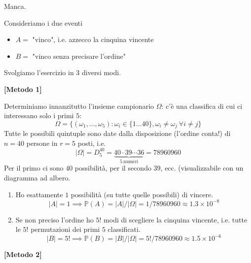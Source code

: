 Manca.
\Soluzione

Consideriamo i due eventi
\begin{itemize}
\item $A=$ "vinco", i.e. azzecco la cinquina vincente
\item $B=$ "vinco senza precisare l'ordine"
\end{itemize}

Svolgiamo l'esercizio in $3$ diversi modi.

\textbf{[Metodo 1]}

Determiniamo innanzitutto l'insieme campionario $\Omega $: c'è una classifica di cui ci interessano solo i primi $5$:
\begin{equation*}
\Omega =\{( \omega _{1} ,\dots ,\omega _{5}) :\omega _{i} \in \{1\dots 40\} ,\omega _{i} \neq \omega _{j} \ \forall i\neq j\}
\end{equation*}
Tutte le possibili quintuple sono date dalla disposizione (l'ordine conta!) di $n=40$ persone in $r=5$ posti, i.e.
\begin{equation*}
| \Omega | =D_{5}^{40} =\underbrace{40\cdot 39\cdots 36}_{5\ \text{numeri}} =78960960
\end{equation*}
Per il primo ci sono $40$ possibilità, per il secondo $39$, ecc. (visualizzabile con un diagramma ad albero.
\begin{enumerate}
\item Ho esattamente $1$ possibilità (su tutte quelle possibili) di vincere.\begin{equation*}
| A| =1\implies \mathbb{P}( A) =| A| /| \Omega | =1/78960960\approx 1.3\times 10^{-8}
\end{equation*}
\item Se non preciso l'ordine ho $5!$ modi di scegliere la cinquina vincente, i.e. tutte le $5!$ permutazioni dei primi $5$ classificati.\begin{equation*}
| B| =5!\implies \mathbb{P}( B) =| B| /| \Omega | =5!/78960960\approx 1.5\times 10^{-6}
\end{equation*}
\end{enumerate}

\textbf{[Metodo 2]}

